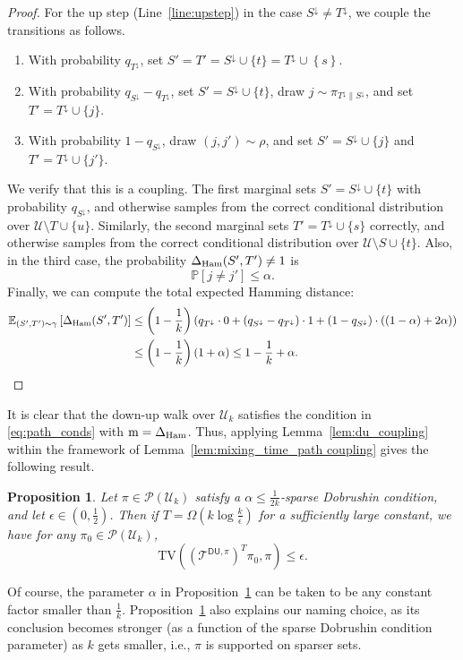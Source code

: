 \documentclass[11pt]{article}
\newtheorem{proposition}{Proposition}
\newcommand{\eps}{\epsilon}
\newcommand{\half}{\frac{1}{2}}
\newcommand{\1}{\mathbf{1}}
\newcommand{\0}{\mathbf{0}}
\newcommand{\E}{\mathbb{E}}
\newcommand{\dham}{\Delta_{\textup{Ham}}}
\newcommand{\Par}[1]{\left(#1\right)}
\newcommand{\Brack}[1]{\left[#1\right]}
\newcommand{\TV}[1]{\mathrm{TV}\left(#1\right)}
\newcommand{\Prob}{\mathbb{P}}
\renewcommand{\Pr}{\Prob}
\newcommand{\met}{\mathrm{m}}
\newcommand{\calP}{{\mathcal{P}}}
\newcommand{\calT}{{\mathcal{T}}}
\newcommand{\calU}{{\mathcal{U}}}
\newcommand{\cbra}[1]{\left\{#1\right\}}
\newcommand{\TDU}[1]{\calT^{\mathsf{DU}, #1}}
\begin{document}
\begin{proof}
For the up step (Line~\ref{line:upstep}) in the case $S^\downarrow \neq T^\downarrow$, we couple the transitions as follows.
\begin{enumerate}
    \item With probability $q_{T^\downarrow}$, set $S' = T' = S^\downarrow \cup \{t\} = T^\downarrow \cup \cbra{s}$.
    \item With probability $q_{S^\downarrow} - q_{T^\downarrow}$, set $S' = S^\downarrow \cup \{t\}$, draw $j \sim \pi_{T^\downarrow \| S^\downarrow}$, and set $T' = T^\downarrow \cup \{j\}$.
    \item With probability $1 - q_{S^\downarrow}$, draw $(j, j') \sim \rho$, and set $S' = S^\downarrow \cup \{j\}$ and $T' = T^\downarrow \cup \{j'\}$.
\end{enumerate}
We verify that this is a coupling. The first marginal sets $S' = S^\downarrow \cup \{t\}$ with probability $q_{S^\downarrow}$, and otherwise samples from the correct conditional distribution over $\calU \setminus T \cup \{u\}$. Similarly, the second marginal sets $T' = T^\downarrow \cup \{s\}$ correctly, and otherwise samples from the correct conditional distribution over $\calU \setminus S \cup \{t\}$. Also, in the third case, the probability $\dham(S', T') \neq 1$ is
\[\Pr\Brack{j \neq j'} \le \alpha.\]
Finally, we can compute the total expected Hamming distance:
\begin{align}\E_{(S', T') \sim \gamma}\Brack{\dham(S', T')} &\le \Par{1 - \frac 1 k} \Par{q_{T^\downarrow} \cdot 0 + (q_{S^\downarrow} - q_{T^\downarrow}) \cdot 1 + (1 - q_{S^\downarrow}) \cdot ((1 - \alpha) + 2\alpha)} \label{eq:expect_ham_diff}\\
&\le \Par{1 - \frac 1 k}\Par{1 + \alpha} \le 1 - \frac 1 k + \alpha.\nonumber
\end{align}
\end{proof}

It is clear that the down-up walk over $\calU_k$ satisfies the condition in \eqref{eq:path_conds} with $\met = \dham$. Thus, applying Lemma~\ref{lem:du_coupling} within the framework of Lemma~\ref{lem:mixing_time_path coupling} gives the following result.

\begin{proposition}
    \label{prop:fast_mixing_slice_general}
Let $\pi \in \calP(\calU_k)$ satisfy a $\alpha \le \tfrac{1}{2k}$-sparse Dobrushin condition, and let $\eps \in (0, \half)$. Then if $T = \Omega(k\log\tfrac{k}{\eps})$ for a sufficiently large constant, we have for any $\pi_0 \in \calP(\calU_k)$,
\[\TV{(\TDU{\pi})^T \pi_0, \pi} \le \eps.\]
\end{proposition}
Of course, the parameter $\alpha$ in Proposition~\ref{prop:fast_mixing_slice_general} can be taken to be any constant factor smaller than $\frac 1 k$.
Proposition~\ref{prop:fast_mixing_slice_general} also explains our naming choice, as its conclusion becomes stronger (as a function of the sparse Dobrushin condition parameter) as $k$ gets smaller, i.e., $\pi$ is supported on sparser sets.
\end{document}

